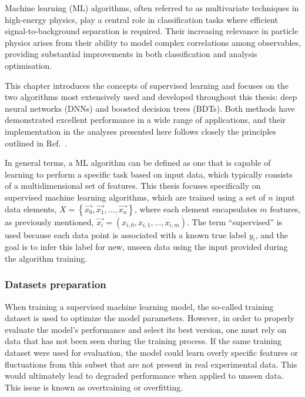



Machine learning (ML) algorithms, often referred to as multivariate techniques in high-energy physics, play a central role in classification tasks where efficient signal-to-background separation is required. Their increasing relevance in particle physics arises from their ability to model complex correlations among observables, providing substantial improvements in both classification and analysis optimisation. 

This chapter introduces the concepts of supervised learning and focuses on the two algorithms most extensively used and developed throughout this thesis: deep neural networks (DNNs) and boosted decision trees (BDTs). Both methods have demonstrated excellent performance in a wide range of applications, and their implementation in the analyses presented here follows closely the principles outlined in Ref.~\cite{Goodfellow-et-al-2016}.

In general terms, a ML algorithm can be defined as one that is capable of learning to perform a specific task based on input data, which typically consists of a multidimensional set of features. This thesis focuses specifically on supervised machine learning algorithms, which are trained using a set of $n$ input data elements, $X = \left\{\vec{x_{0}}, \vec{x_{1}}, ..., \vec{x_{n}} \right\}$, where each element encapsulates $m$ features, as previously mentioned, $\vec{x_{i}}=(x_{i,0}, x_{i,1}, ..., x_{i,m})$. The term ``supervised'' is used because each data point is associated with a known true label $y_{i}$, and the goal is to infer this label for new, unseen data using the input provided during the algorithm training.

\subsubsection*{Datasets preparation}
When training a supervised machine learning model, the so-called training dataset is used to optimize the model parameters. However, in order to properly evaluate the model's performance and select its best version, one must rely on data that has not been seen during the training process. If the same training dataset were used for evaluation, the model could learn overly specific features or fluctuations from this subset that are not present in real experimental data. This would ultimately lead to degraded performance when applied to unseen data. This issue is known as overtraining or overfitting.

